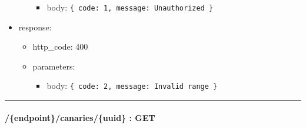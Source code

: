 \documentclass[
]{article}
\begin{document}
\begin{itemize}
\begin{itemize}
    \begin{itemize}
    \item
      body: \texttt{\{
      \textquotesingle{}code\textquotesingle{}:\ 1,\ 
      \textquotesingle{}message\textquotesingle{}:\ \textquotesingle{}Unauthorized\textquotesingle{}
      \}}
    \end{itemize}
  \end{itemize}
\item
  response:

  \begin{itemize}
  \item
    http\_code: 400
  \item
    parameters:

    \begin{itemize}
    \item
      body: \texttt{\{
      \textquotesingle{}code\textquotesingle{}:\ 2,\ 
      \textquotesingle{}message\textquotesingle{}:\ \textquotesingle{}Invalid\ range\textquotesingle{}
      \}}
    \end{itemize}
  \end{itemize}
\end{itemize}

\begin{center}\rule{0.5\linewidth}{0.5pt}\end{center}

\hypertarget{header-n61401}{%
\paragraph{/\{endpoint\}/canaries/\{uuid\} : GET}\label{header-n61401}}
\end{document}
